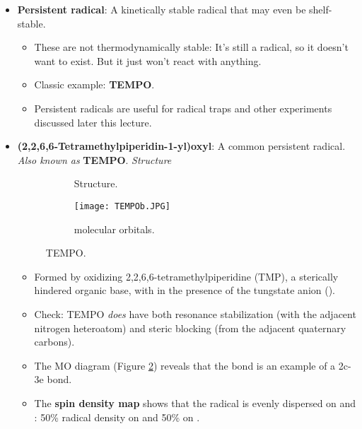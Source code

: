 \documentclass[../notes.tex]{subfiles}
\begin{document}
\begin{itemize}
\begin{itemize}
    \end{itemize}
    \item \textbf{Persistent radical}: A kinetically stable radical that may even be shelf-stable.
    \begin{itemize}
        \item These are not thermodynamically stable: It's still a radical, so it doesn't want to exist. But it just won't react with anything.
        \item Classic example: \textbf{TEMPO}.
        \item Persistent radicals are useful for radical traps and other experiments discussed later this lecture.
    \end{itemize}
    \item \textbf{(2,2,6,6-Tetramethylpiperidin-1-yl)oxyl}: A common persistent radical. \emph{Also known as} \textbf{TEMPO}. \emph{Structure}
    \begin{figure}[H]
        \centering
        \begin{subfigure}[b]{0.3\linewidth}
            \centering
            \footnotesize
            \caption{Structure.}
            \label{fig:TEMPOa}
        \end{subfigure}
        \begin{subfigure}[b]{0.3\linewidth}
            \centering
            \texttt{[image: TEMPOb.JPG]}
            \caption{ molecular orbitals.}
            \label{fig:TEMPOb}
        \end{subfigure}
        \caption{TEMPO.}
        \label{fig:TEMPO}
    \end{figure}
    \begin{itemize}
        \item Formed by oxidizing 2,2,6,6-tetramethylpiperidine (TMP), a sterically hindered organic base, with  in the presence of the tungstate anion ().
        \item Check: TEMPO \emph{does} have both resonance stabilization (with the adjacent nitrogen heteroatom) and steric blocking (from the adjacent quaternary carbons).
        \item The MO diagram (Figure \ref{fig:TEMPOb}) reveals that the  bond is an example of a 2c-3e bond.
        \item The \textbf{spin density map} shows that the radical is evenly dispersed on  and : 50\% radical density on  and 50\% on .

\end{itemize}
\end{itemize}
\end{document}
